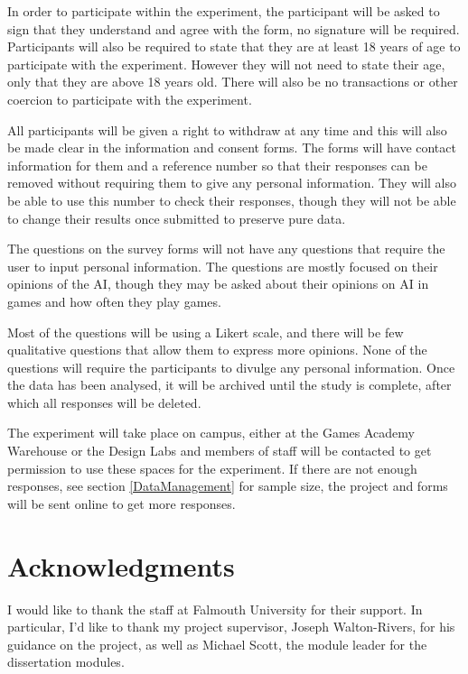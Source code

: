 \documentclass{IEEEtran}
\begin{document}
In order to participate within the experiment, the participant will be asked to sign that they understand and agree with the form, no signature will be required. Participants will also be required to state that they are at least 18 years of age to participate with the experiment. However they will not need to state their age, only that they are above 18 years old. There will also be no transactions or other coercion to participate with the experiment.

All participants will be given a right to withdraw at any time and this will also be made clear in the information and consent forms. The forms will have contact information for them and a reference number so that their responses can be removed without requiring them to give any personal information. They will also be able to use this number to check their responses, though they will not be able to change their results once submitted to preserve pure data.

The questions on the survey forms will not have any questions that require the user to input personal information. The questions are mostly focused on their opinions of the AI, though they may be asked about their opinions on AI in games and how often they play games.

Most of the questions will be using a Likert scale, and there will be few qualitative questions that allow them to express more opinions. None of the questions will require the participants to divulge any personal information. Once the data has been analysed, it will be archived until the study is complete, after which all responses will be deleted.

The experiment will take place on campus, either at the Games Academy Warehouse or the Design Labs and members of staff will be contacted to get permission to use these spaces for the experiment. If there are not enough responses, see section \ref{DataManagement} for sample size, the project and forms will be sent online to get more responses.

\section*{Acknowledgments}

I would like to thank the staff at Falmouth University for their support. In particular, I'd like to thank my project supervisor, Joseph Walton-Rivers, for his guidance on the project, as well as Michael Scott, the module leader for the dissertation modules.
\end{document}
